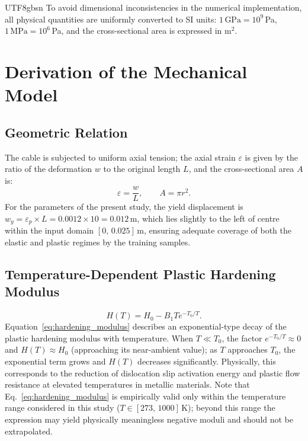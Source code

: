 \documentclass[a4paper,12pt]{report}
\begin{document}
\begin{CJK}{UTF8}{gbsn}
To avoid dimensional inconsistencies in the numerical implementation, all physical
quantities are uniformly converted to SI units: $1\,\text{GPa} = 10^9$\,Pa,
$1\,\text{MPa} = 10^6$\,Pa, and the cross-sectional area is expressed in m$^2$.

\section{Derivation of the Mechanical Model}
\label{sec:mechanics_derivation}

\subsection{Geometric Relation}
\label{subsec:geometry}

The cable is subjected to uniform axial tension; the axial strain $\varepsilon$ is given
by the ratio of the deformation $w$ to the original length $L$, and the cross-sectional
area $A$ is:
\begin{equation}
  \varepsilon = \frac{w}{L}, \qquad A = \pi r^2.
  \label{eq:geometry}
\end{equation}
For the parameters of the present study, the yield displacement is
$w_y = \varepsilon_p \times L = 0.0012 \times 10 = 0.012$\,m, which lies slightly to
the left of centre within the input domain $[0,\,0.025]$\,m, ensuring adequate coverage
of both the elastic and plastic regimes by the training samples.

\subsection{Temperature-Dependent Plastic Hardening Modulus}
\label{subsec:hardening}

\begin{equation}
  H(T) = H_0 - B_1 T e^{-T_0/T}.
  \label{eq:hardening_modulus}
\end{equation}
Equation~\eqref{eq:hardening_modulus} describes an exponential-type decay of the plastic
hardening modulus with temperature. When $T \ll T_0$, the factor $e^{-T_0/T} \approx 0$
and $H(T) \approx H_0$ (approaching its near-ambient value); as $T$ approaches $T_0$,
the exponential term grows and $H(T)$ decreases significantly. Physically, this
corresponds to the reduction of dislocation slip activation energy and plastic flow
resistance at elevated temperatures in metallic materials. Note that
Eq.~\eqref{eq:hardening_modulus} is empirically valid only within the temperature range
considered in this study ($T \in [273,\,1000]$\,K); beyond this range the expression
may yield physically meaningless negative moduli and should not be extrapolated.


\end{CJK}
\end{document}
